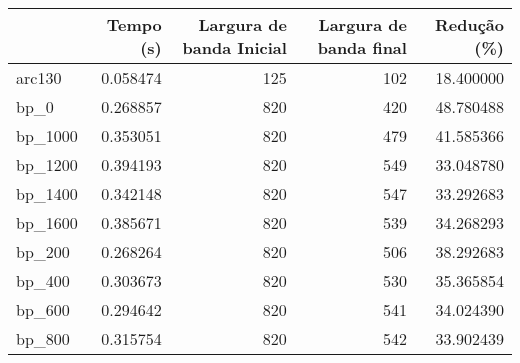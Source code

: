  \begin{tabular}{lrrrr}
\toprule
{} &  Tempo (s) &  Largura de banda Inicial &  Largura de banda final &  Redução (\%) \\
\midrule
arc130  &   0.058474 &                       125 &                     102 &    18.400000 \\
bp_0    &   0.268857 &                       820 &                     420 &    48.780488 \\
bp_1000 &   0.353051 &                       820 &                     479 &    41.585366 \\
bp_1200 &   0.394193 &                       820 &                     549 &    33.048780 \\
bp_1400 &   0.342148 &                       820 &                     547 &    33.292683 \\
bp_1600 &   0.385671 &                       820 &                     539 &    34.268293 \\
bp_200  &   0.268264 &                       820 &                     506 &    38.292683 \\
bp_400  &   0.303673 &                       820 &                     530 &    35.365854 \\
bp_600  &   0.294642 &                       820 &                     541 &    34.024390 \\
bp_800  &   0.315754 &                       820 &                     542 &    33.902439 \\
\bottomrule
\end{tabular}